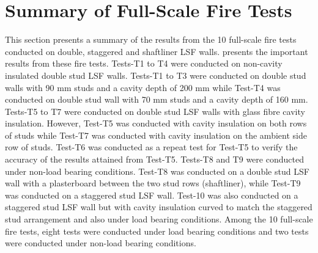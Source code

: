 \section{Summary of Full-Scale Fire Tests}

This section presents a summary of the results from the 10 full-scale fire tests conducted on double, staggered and shaftliner LSF walls.  presents the important results from these fire tests. Tests-T1 to T4 were conducted on non-cavity insulated double stud LSF walls. Tests-T1 to T3 were conducted on double stud walls with 90 mm studs and a cavity depth of 200 mm while Test-T4 was conducted on double stud wall with 70 mm studs and a cavity depth of 160 mm. Tests-T5 to T7 were conducted on double stud LSF walls with glass fibre cavity insulation. However, Test-T5 was conducted with cavity insulation on both rows of studs while Test-T7 was conducted with cavity insulation on the ambient side row of studs. Test-T6 was conducted as a repeat test for Test-T5 to verify the accuracy of the results attained from Test-T5. Tests-T8 and T9 were conducted under non-load bearing conditions. Test-T8 was conducted on a double stud LSF wall with a plasterboard between the two stud rows (shaftliner), while Test-T9 was conducted on a staggered stud LSF wall. Test-10 was also conducted on a staggered stud LSF wall but with cavity insulation curved to match the staggered stud arrangement and also under load bearing conditions. Among the 10 full-scale fire tests, eight tests were conducted under load bearing conditions and two tests were conducted under non-load bearing conditions.
